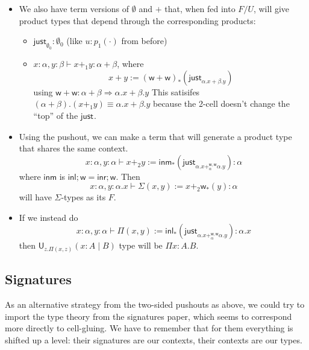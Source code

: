 \documentclass[10pt]{article}
\newcommand\U[3]{\ensuremath{\mathsf{U}_{#1}(#2 \mid #3)}}
\newcommand\just[1]{\ensuremath{\textsf{just}_{#1}}}
\newcommand\Pushout[5]{\ensuremath{#1 +^{#4,#5}_{#2} #3}}
\begin{document}
\begin{itemize}
\item 

We also have term versions of $\emptyset$ and $+$ that, when fed into
$F/U$, will give product types that depend through the corresponding
products:
\begin{itemize}
\item $\just{\emptyset_0} : \emptyset_0$ (like $u : p_1(\cdot)$ from
  before)

\item $x : \alpha, y : \beta \vdash x +_1 y : \alpha + \beta$, where 
\[x + y := (\mathsf{w} + \mathsf{w})_* (\just{\alpha.x + \beta.y})
\]
using $\mathsf{w} + \mathsf{w} : \alpha + \beta \Rightarrow {\alpha.x +
  \beta.y}$ This satisifes $(\alpha+\beta).(x +_1 y) \equiv \alpha.x +
\beta.y$ because the 2-cell doesn't change the ``top'' of the \just{}.
\end{itemize}

\item Using the pushout, we can make a term that will generate a product type
that shares the same context.
\[
x : \alpha, y : \alpha \vdash x +_2 y := 
\mathsf{inm}_*(\just{\Pushout{\alpha.x}{\alpha}{\alpha.y}{\mathsf{w}}{\mathsf{w}}})
: \alpha
\]
where $\mathsf{inm}$ is $\mathsf{inl};\mathsf{w} =
\mathsf{inr};\mathsf{w}$.   Then 
\[
x : \alpha, y : \alpha.x \vdash \Sigma(x,y) := x +_2 \mathsf{w}_*(y) : \alpha
\]
will have $\Sigma$-types as its $F$.  

\item If we instead do 
\[
x : \alpha, y : \alpha \vdash \Pi(x,y) := 
\mathsf{inl}_*(\just{\Pushout{\alpha.x}{\alpha}{\alpha.y}{\mathsf{w}}{\mathsf{w}}})
: \alpha.x
\]
then \U{z.\Pi(x,z)}{x:A}{B} type will be $\Pi x:A.B$.  

\end{itemize}

\subsection{Signatures}

As an alternative strategy from the two-sided pushouts as above, we could try to import the type theory from the signatures paper, which seems to correspond more directly to cell-gluing. We have to remember that for them everything is shifted up a level: their signatures are our contexts, their contexts are our types. 
\end{document}

